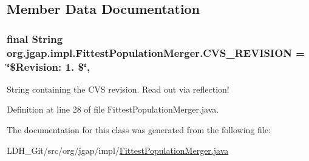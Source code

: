 \subsection{Member Data Documentation}
\hypertarget{classorg_1_1jgap_1_1impl_1_1_fittest_population_merger_a95733340fb668bfd83f3c45e6a571ef6}{
\subsubsection[{C\-V\-S\-\_\-\-R\-E\-V\-I\-S\-I\-O\-N}]{\setlength{\rightskip}{0pt plus 5cm}final String org.\-jgap.\-impl.\-Fittest\-Population\-Merger.\-C\-V\-S\-\_\-\-R\-E\-V\-I\-S\-I\-O\-N = \char`\"{}\$Revision\-: 1. \$\char`\"{}\hspace{0.3cm}{\ttfamily [static]}, {\ttfamily [private]}}}\label{classorg_1_1jgap_1_1impl_1_1_fittest_population_merger_a95733340fb668bfd83f3c45e6a571ef6}
String containing the C\-V\-S revision. Read out via reflection! 

Definition at line 28 of file Fittest\-Population\-Merger.\-java.



The documentation for this class was generated from the following file\-:\begin{DoxyCompactItemize}
\item 
L\-D\-H\-\_\-\-Git/src/org/jgap/impl/\hyperlink{_fittest_population_merger_8java}{Fittest\-Population\-Merger.\-java}\end{DoxyCompactItemize}
